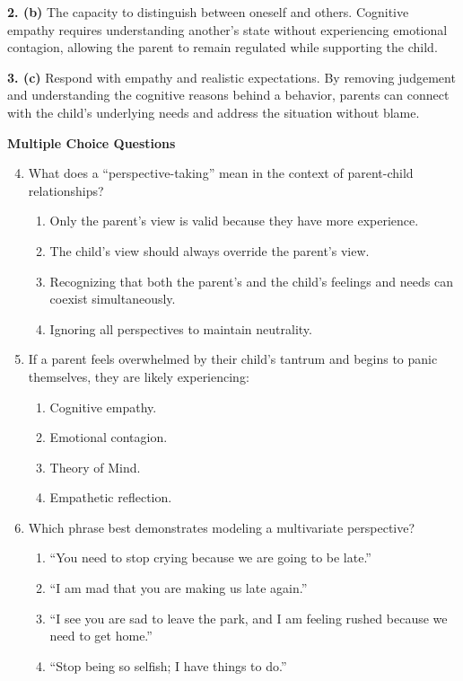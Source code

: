 \begin{practiceexercise}
\textbf{2. (b)} The capacity to distinguish between oneself and others. Cognitive empathy requires understanding another's state without experiencing emotional contagion, allowing the parent to remain regulated while supporting the child.

\textbf{3. (c)} Respond with empathy and realistic expectations. By removing judgement and understanding the cognitive reasons behind a behavior, parents can connect with the child's underlying needs and address the situation without blame.
\vspace{\fill}
\newpage

\textbf{Multiple Choice Questions}
\begin{enumerate}
  \setcounter{enumi}{3}
  \item What does a ``perspective-taking'' mean in the context of parent-child relationships?
  \begin{enumerate}
    \item Only the parent's view is valid because they have more experience.
    \item The child's view should always override the parent's view.
    \item Recognizing that both the parent's and the child's feelings and needs can coexist simultaneously.
    \item Ignoring all perspectives to maintain neutrality.
  \end{enumerate}
  \vspace{\fill}
  \item If a parent feels overwhelmed by their child's tantrum and begins to panic themselves, they are likely experiencing:
  \begin{enumerate}
    \item Cognitive empathy.
    \item Emotional contagion.
    \item Theory of Mind.
    \item Empathetic reflection.
  \end{enumerate}
  \vspace{\fill}
  \item Which phrase best demonstrates modeling a multivariate perspective?
  \begin{enumerate}
    \item ``You need to stop crying because we are going to be late.''
    \item ``I am mad that you are making us late again.''
    \item ``I see you are sad to leave the park, and I am feeling rushed because we need to get home.''
    \item ``Stop being so selfish; I have things to do.''
  \end{enumerate}
\end{enumerate}
\vspace{\fill}
\newpage


\end{practiceexercise}
